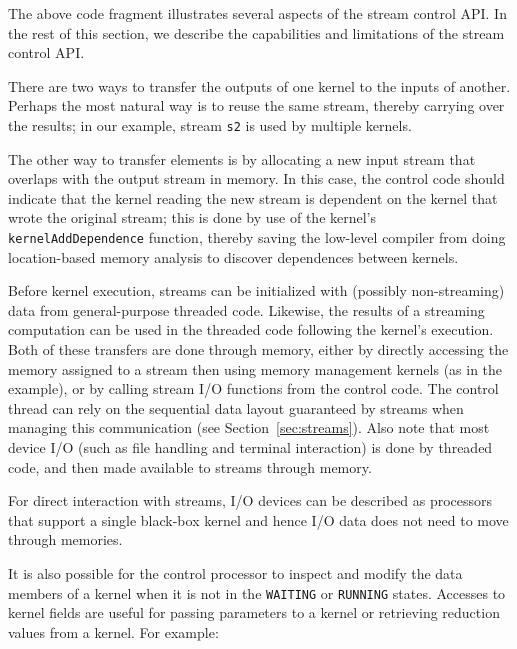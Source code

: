 \clearpage
The above code fragment illustrates several aspects of the stream
control API.  In the rest of this section, we describe the
capabilities and limitations of the stream control API.


There are two ways to transfer the outputs of one kernel to the inputs
of another.  Perhaps the most natural way is to reuse the same stream,
thereby carrying over the results; in our example, stream {\tt s2} is
used by multiple kernels.

The other way to transfer elements is by allocating a new input stream
that overlaps with the output stream in memory.  In this case, the
control code should indicate that the kernel reading the new stream is
dependent on the kernel that wrote the original stream; this is done
by use of the kernel's {\tt kernelAddDependence} function, thereby
saving the low-level compiler from doing location-based memory
analysis to discover dependences between kernels.


Before kernel execution, streams can be initialized with (possibly
non-streaming) data from general-purpose threaded code.  Likewise, the
results of a streaming computation can be used in the threaded code
following the kernel's execution.  Both of these transfers are done
through memory, either by directly accessing the memory assigned to a
stream then using memory management kernels (as in the example), or by
calling stream I/O functions from the control code.  The control
thread can rely on the sequential data layout guaranteed by streams
when managing this communication (see Section~\ref{sec:streams}).
Also note that most device I/O (such as file handling and terminal
interaction) is done by threaded code, and then made available to
streams through memory.

For direct interaction with streams, I/O devices can be described as
processors that support a single black-box kernel and hence I/O data
does not need to move through memories.

It is also possible for the control processor to inspect and modify
the data members of a kernel when it is not in the {\tt WAITING} or
{\tt RUNNING} states. Accesses to kernel fields are useful for passing
parameters to a kernel or retrieving reduction values from a kernel.
For example:

